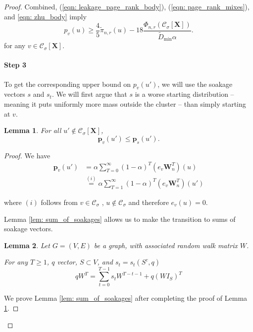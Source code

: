 \documentclass{article}
\newcommand{\1}{\mathbf{1}}
\newcommand{\pbf}{\mathbf{p}}
\newcommand{\Xbf}{\mathbf{X}}
\newcommand{\Wbf}{\mathbf{W}}
\newcommand{\Cset}{\mathcal{C}}
\newcommand{\Csig}{\Cset_{\sigma}}
\theoremstyle{aldenthm}
\newtheorem{lemma}{Lemma}
\begin{document}
\begin{proof}
	
	Combined, (\ref{eqn: leakage_page_rank_body}), (\ref{eqn: page_rank_mixes}), and \eqref{eqn: zhu_body} imply
	\begin{equation*}
	p_v(u) \geq \frac{4}{5} \widetilde{\pi}_{n,r}(u) - 18\frac{ \Phi_{n,r}(\Csig[\Xbf])}{\widetilde{D}_{\min} \alpha}.
	\end{equation*}
	for any $v \in \Csig[\Xbf]$. 
	
	\paragraph{Step 3}
	To get the corresponding upper bound on $p_v(u')$, we will use the soakage vectors $s$ and $s_t$. We will first argue that $s$ is a worse starting distribution -- meaning it puts uniformly more mass outside the cluster -- than simply starting at $v$.
	
	\begin{lemma} \label{lem: gained mass is soaked_body}
		For all $u' \notin \Csig[\Xbf]$,
		\begin{equation}
		\pbf_v(u') \leq \pbf_{s}(u').
		\end{equation}
	\end{lemma}
	
	\begin{proof}
		
		We have
		\begin{align*}
		\pbf_v(u') & = \alpha \sum_{T=0}^{\infty} (1 - \alpha)^T (e_v \Wbf_n^T)(u)\\
		& \overset{(i)}{=} \alpha \sum_{T=1}^{\infty} (1 - \alpha)^T (e_v \Wbf_n^T)(u')
		\end{align*}
		
		where $(i)$ follows from $v \in \Csig$ , $u \not\in \Csig$ and therefore $e_v(u) = 0$. 
		
		Lemma \ref{lem: sum_of_soakages} allows us to make the transition to sums of soakage vectors. 
		\begin{lemma}
			
			Let $G = (V,E)$ be a graph, with associated random walk matrix $W$.
			
			For any $T \geq 1$, $q$ vector, $S \subset V$, and $s_t = s_t(S^c,q)$
			\begin{equation}
			qW^T = \sum_{t = 0}^{T - 1} s_t W^{T - t - 1} + q(W I_S)^T
			\end{equation}
		\end{lemma}
		We prove Lemma \ref{lem: sum_of_soakages} after completing the proof of Lemma \ref{lem: gained mass is soaked_body}.
		

\end{proof}
\end{proof}
\end{document}
